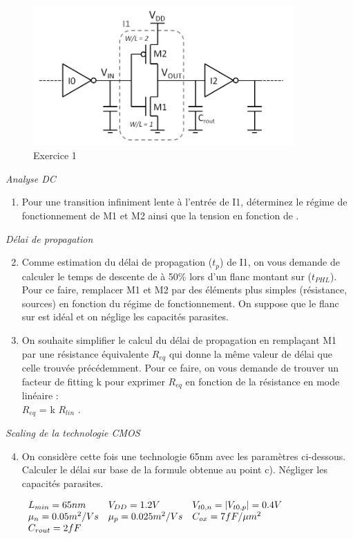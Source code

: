 \documentclass[paper=a4, fontsize=11pt]{article} %
\numberwithin{equation}{section} %
\numberwithin{figure}{section} %
\numberwithin{table}{section} %
\begin{document}
\begin{figure}[!htbp]
   \centering
   \includegraphics[width=10cm]{figure/fig7-2.png}
   \caption{Exercice 1}
   \label{fig7-2}
\end{figure}

\emph{Analyse DC}
\begin{enumerate}
	\item Pour une transition infiniment lente à l'entrée de I1, déterminez le régime de fonctionnement de M1 et M2 ainsi que la tension \vout en fonction de \vin.
\end{enumerate}

\emph{Délai de propagation}
\begin{enumerate}
\setcounter{enumi}{1}
\item Comme estimation du délai de propagation ($t_p$) de I1, on vous demande de calculer le temps de descente de \vout à 50\% lors d'un flanc montant sur \vin ($t_{PHL}$). Pour ce faire, remplacer M1 et M2 par des éléments plus simples (résistance, sources) en fonction du régime de fonctionnement. On suppose que le flanc sur \vin est idéal et on néglige les capacités parasites.
\item On souhaite simplifier le calcul du délai de propagation en remplaçant M1 par une résistance équivalente $R_{eq}$ qui donne la même valeur de délai que celle trouvée précédemment. Pour ce faire, on vous demande de trouver un facteur de fitting k pour exprimer $R_{eq}$ en fonction de la résistance en mode linéaire :\\ $R_{eq}$ = k $R_{lin}$ .
\end{enumerate}

\emph{Scaling de la technologie CMOS}
\begin{enumerate}
\setcounter{enumi}{3}
\item On considère cette fois une technologie 65nm avec les paramètres ci-dessous. Calculer le délai sur base de la formule obtenue au point c). Négliger les capacités parasites.

\begin{center}
$
	\begin{array}{l l l}
		L_{min} = 65 nm 				&V_{DD} = 1.2V 						&V_{t0,n} = |V_{t0,p}| = 0.4V\\
		\mu_n = 0.05 m^2/Vs 	&\mu_p= 0.025 m^2/Vs	& C_{ox} = 7 fF/\mu m^2\\
		C_{rout} = 2fF&&\\
	\end{array}
	$
\end{center}
\end{enumerate}
\end{document}
